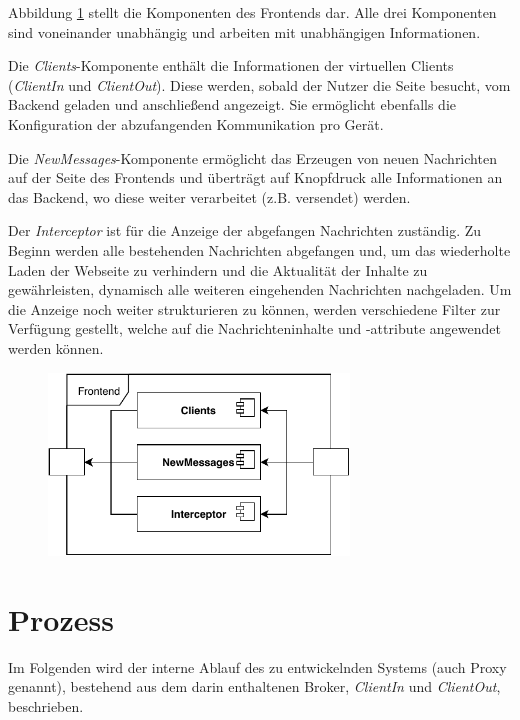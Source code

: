     Abbildung \ref{fig:system_frontend} stellt die Komponenten des Frontends dar. Alle drei Komponenten sind voneinander unabhängig und arbeiten mit unabhängigen Informationen.
    
    Die \emph{Clients}-Komponente enthält die Informationen der virtuellen Clients (\emph{ClientIn} und \emph{ClientOut}). Diese werden, sobald der Nutzer die Seite besucht, vom Backend geladen und anschließend angezeigt. Sie ermöglicht ebenfalls die Konfiguration der abzufangenden Kommunikation pro Gerät.
    
    Die \emph{NewMessages}-Komponente ermöglicht das Erzeugen von neuen Nachrichten auf der Seite des Frontends und überträgt auf Knopfdruck alle Informationen an das Backend, wo diese weiter verarbeitet (z.B. versendet) werden.
    
    Der \emph{Interceptor} ist für die Anzeige der abgefangen Nachrichten zuständig. Zu Beginn werden alle bestehenden Nachrichten abgefangen und, um das wiederholte Laden der Webseite zu verhindern und die Aktualität der Inhalte zu gewährleisten, dynamisch alle weiteren eingehenden Nachrichten nachgeladen. Um die Anzeige noch weiter strukturieren zu können, werden verschiedene Filter zur Verfügung gestellt, welche auf die Nachrichteninhalte und -attribute angewendet werden können.
    
    \begin{figure}[h]%
        \centering
        \includegraphics[width=8cm]{tex/bilder/4_konzept/Systemdiagramm_Konzept_Frontend.pdf}
        \label{fig:system_frontend}
    \end{figure}

\section{Prozess}
    Im Folgenden wird der interne Ablauf des zu entwickelnden Systems (auch Proxy genannt), bestehend aus dem darin enthaltenen Broker, \emph{ClientIn} und \emph{ClientOut}, beschrieben.

